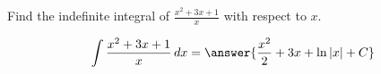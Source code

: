 \documentclass{ximera}
\author{Gregory Hartman \and Matthew Carr}
\begin{document}
\begin{exercise}

Find the indefinite integral of $\frac{x^2+3 x+1}{x}$ with respect to $x$.

\[
\int \frac{x^2+3 x+1}{x}\d x=\answer{\frac{x^2}{2}+3 x+\ln|x|+C}
\]

\end{exercise}
\end{document}
